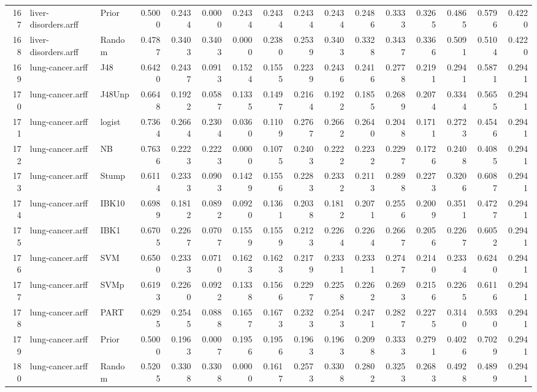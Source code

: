 \documentclass {article}
\begin{document}
\begin{table}[ht]
\begin{tabular}{rllrrrrrrrrrrrrr}
  167 & liver-disorders.arff & Prior & 0.5000 & 0.2434 & 0.0000 & 0.2434 & 0.2434 & 0.2434 & 0.2434 & 0.2486 & 0.3333 & 0.3265 & 0.4865 & 0.5796 & 0.4220 \\ 
  168 & liver-disorders.arff & Random & 0.4787 & 0.3403 & 0.3403 & 0.0000 & 0.2380 & 0.2539 & 0.3403 & 0.3328 & 0.3437 & 0.3366 & 0.5091 & 0.5104 & 0.4220 \\ 
  169 & lung-cancer.arff & J48 & 0.6420 & 0.2437 & 0.0913 & 0.1524 & 0.1555 & 0.2239 & 0.2436 & 0.2416 & 0.2778 & 0.2191 & 0.2941 & 0.5871 & 0.2941 \\ 
  170 & lung-cancer.arff & J48Unp & 0.6648 & 0.1922 & 0.0587 & 0.1335 & 0.1497 & 0.2164 & 0.1922 & 0.1855 & 0.2689 & 0.2074 & 0.3344 & 0.5655 & 0.2941 \\ 
  171 & lung-cancer.arff & logist & 0.7364 & 0.2664 & 0.2304 & 0.0360 & 0.1109 & 0.2767 & 0.2662 & 0.2640 & 0.2048 & 0.1711 & 0.2723 & 0.4546 & 0.2941 \\ 
  172 & lung-cancer.arff & NB & 0.7636 & 0.2223 & 0.2223 & 0.0000 & 0.1075 & 0.2403 & 0.2222 & 0.2232 & 0.2297 & 0.1726 & 0.2408 & 0.4085 & 0.2941 \\ 
  173 & lung-cancer.arff & Stump & 0.6114 & 0.2333 & 0.0903 & 0.1429 & 0.1556 & 0.2283 & 0.2332 & 0.2113 & 0.2898 & 0.2273 & 0.3206 & 0.6087 & 0.2941 \\ 
  174 & lung-cancer.arff & IBK10 & 0.6989 & 0.1812 & 0.0892 & 0.0920 & 0.1361 & 0.2038 & 0.1812 & 0.2071 & 0.2556 & 0.2009 & 0.3511 & 0.4727 & 0.2941 \\ 
  175 & lung-cancer.arff & IBK1 & 0.6705 & 0.2267 & 0.0707 & 0.1559 & 0.1559 & 0.2123 & 0.2264 & 0.2264 & 0.2667 & 0.2056 & 0.2267 & 0.6052 & 0.2941 \\ 
  176 & lung-cancer.arff & SVM & 0.6500 & 0.2333 & 0.0710 & 0.1623 & 0.1623 & 0.2179 & 0.2331 & 0.2331 & 0.2747 & 0.2140 & 0.2334 & 0.6240 & 0.2941 \\ 
  177 & lung-cancer.arff & SVMp & 0.6193 & 0.2260 & 0.0922 & 0.1338 & 0.1566 & 0.2297 & 0.2258 & 0.2262 & 0.2693 & 0.2156 & 0.2265 & 0.6116 & 0.2941 \\ 
  178 & lung-cancer.arff & PART & 0.6295 & 0.2545 & 0.0888 & 0.1657 & 0.1673 & 0.2323 & 0.2543 & 0.2471 & 0.2827 & 0.2275 & 0.3140 & 0.5930 & 0.2941 \\ 
  179 & lung-cancer.arff & Prior & 0.5000 & 0.1963 & 0.0007 & 0.1956 & 0.1956 & 0.1963 & 0.1963 & 0.2098 & 0.3333 & 0.2791 & 0.4026 & 0.7029 & 0.2941 \\ 
  180 & lung-cancer.arff & Random & 0.5205 & 0.3308 & 0.3308 & 0.0000 & 0.1617 & 0.2573 & 0.3308 & 0.2802 & 0.3253 & 0.2683 & 0.4928 & 0.4899 & 0.2941 \\ 

\end{tabular}
\end{table}
\end{document}
